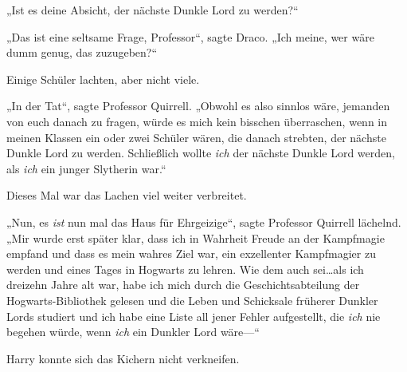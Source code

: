 „Ist es deine Absicht, der nächste Dunkle Lord zu werden?“

„Das ist eine seltsame Frage, Professor“, sagte Draco. „Ich meine, wer wäre dumm genug, das zuzugeben?“

Einige Schüler lachten, aber nicht viele.

„In der Tat“, sagte Professor Quirrell. „Obwohl es also sinnlos wäre, jemanden von euch danach zu fragen, würde es mich kein bisschen überraschen, wenn in meinen Klassen ein oder zwei Schüler wären, die danach strebten, der nächste Dunkle Lord zu werden. Schließlich wollte \emph{ich} der nächste Dunkle Lord werden, als \emph{ich} ein junger Slytherin war.“

Dieses Mal war das Lachen viel weiter verbreitet.

„Nun, es \emph{ist} nun mal das Haus für Ehrgeizige“, sagte Professor Quirrell lächelnd. „Mir wurde erst später klar, dass ich in Wahrheit Freude an der Kampfmagie empfand und dass es mein wahres Ziel war, ein exzellenter Kampfmagier zu werden und eines Tages in Hogwarts zu lehren. Wie dem auch sei…als ich dreizehn Jahre alt war, habe ich mich durch die Geschichtsabteilung der Hogwarts-Bibliothek gelesen und die Leben und Schicksale früherer Dunkler Lords studiert und ich habe eine Liste all jener Fehler aufgestellt, die \emph{ich} nie begehen würde, wenn \emph{ich} ein Dunkler Lord wäre—“

Harry konnte sich das Kichern nicht verkneifen.

